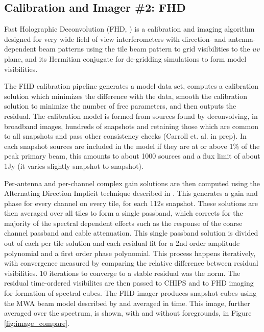 \documentclass[twolcolumn,iop]{emulateapj}
\begin{document}
\subsection{Calibration and Imager \#2: FHD}
\label{sec:FHD}
Fast Holographic Deconvolution (FHD, \cite{Sullivan:2012p9457}) is a calibration and imaging algorithm designed for very wide field of view interferometers with direction- and antenna-dependent beam patterns using the tile beam pattern to grid visibilities to the $uv$ plane, and its Hermitian conjugate for de-gridding simulations to form model visibilities. 

The FHD calibration pipeline generates a model data set, computes a calibration solution which minimizes the difference with the data, smooth the calibration solution to minimize the number of free parameters, and then outputs the residual. The calibration model is formed from sources found by deconvolving, in broadband images, hundreds of snapshots and retaining those which are common to all snapshots and pass other consistency checks (Carroll et. al. in prep). In each snapshot sources are included in the model if they are at or above 1\% of the peak primary beam, this amounts to about 1000 sources and a flux limit of about 1Jy (it varies slightly snapshot to snapshot). %

 Per-antenna and per-channel complex gain solutions are then computed using the Alternating Direction Implicit technique described in \citet{sal14}.  This generates a gain and phase for every channel on every tile, for each 112s snapshot.  These solutions are then averaged over all tiles to form a single passband, which corrects for the majority of the spectral dependent effects such as the response of the coarse channel passband and cable attenuation.  This single passband solution is divided out of each per tile solution and each residual fit for a 2nd order amplitude polynomial and a first order phase polynomial. This process happens iteratively, with convergence measured by comparing the relative difference between residual visibilities. 10 iterations to converge to a stable residual was the norm.  The residual time-ordered visibilites are then passed to CHIPS and to FHD imaging for formation of spectral cubes.  The FHD imager  produces snapshot cubes using the MWA beam model described by \cite{Sutinjo:2015RaSc...50...52S} and averaged in time. This image, further averaged over the spectrum, is shown, with and without foregrounds, in Figure \ref{fig:image_compare}.
\end{document}
